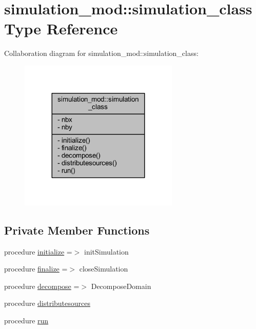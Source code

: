 \hypertarget{structsimulation__mod_1_1simulation__class}{}\section{simulation\+\_\+mod\+:\+:simulation\+\_\+class Type Reference}
\label{structsimulation__mod_1_1simulation__class}


Collaboration diagram for simulation\+\_\+mod\+:\+:simulation\+\_\+class\+:\nopagebreak
\begin{figure}[H]
\begin{center}
\leavevmode
\includegraphics[width=215pt]{structsimulation__mod_1_1simulation__class__coll__graph}
\end{center}
\end{figure}
\subsection*{Private Member Functions}
\begin{DoxyCompactItemize}
\item 
procedure \mbox{\hyperlink{structsimulation__mod_1_1simulation__class_a8bfe8e1f97c7cbdfc2617da0355f65a5}{initialize}} =$>$ init\+Simulation
\item 
procedure \mbox{\hyperlink{structsimulation__mod_1_1simulation__class_a7699b373324ef011e2d514173681eb2a}{finalize}} =$>$ close\+Simulation
\item 
procedure \mbox{\hyperlink{structsimulation__mod_1_1simulation__class_a5c614118dc1ffc74245ef0c5b2cc3a1d}{decompose}} =$>$ Decompose\+Domain
\item 
procedure \mbox{\hyperlink{structsimulation__mod_1_1simulation__class_afcc0d63c0a27727f834304b6a7827f3c}{distributesources}}
\item 
procedure \mbox{\hyperlink{structsimulation__mod_1_1simulation__class_a47d3f761f38558be6fcfe11f235c7699}{run}}
\end{DoxyCompactItemize}
